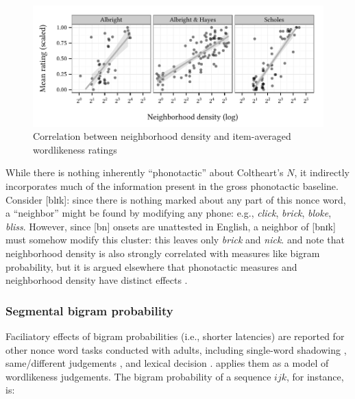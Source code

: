 
\begin{figure}[ht]
\centering
\includegraphics{neighborhood.pdf}
\caption{Correlation between neighborhood density and item-averaged wordlikeness ratings}
\label{neighborhood}
\end{figure}

While there is nothing inherently ``phonotactic'' about Coltheart's $N$, it indirectly incorporates much of the information present in the gross phonotactic baseline. 
Consider [blɪk]: since there is nothing marked about any part of this nonce word, a ``neighbor'' might be found by modifying any phone: e.g., \emph{click}, \emph{brick}, \emph{bloke}, \emph{bliss}. 
However, since [bn] onsets are unattested in English, a neighbor of [bnɪk] must somehow modify this cluster: this leaves only \emph{brick} and \emph{nick}. 
\citet{Bailey2001} and \citet{Frauenfelder1993} note that neighborhood density is also strongly correlated with measures like bigram probability, but it is argued elsewhere that phonotactic measures and neighborhood density have distinct effects \citep[e.g.,][]{Berent2003,Pitt1998b,Vitevitch1998,Vitevitch1999a}. 

\subsubsection{Segmental bigram probability}

Faciliatory effects of bigram probabilities (i.e., shorter latencies) are reported for other nonce word tasks conducted with adults, including single-word shadowing \citep{Vitevitch1997,Vitevitch1998}, same/different judgements \citep{Lipinski2005,Luce2001,Vitevitch1999a,Vitevitch2005}, and lexical decision \citep{Pylkkanen2002a}. \citet{Albright2009a} applies them as a model of wordlikeness judgements. The bigram probability of a sequence $ijk$, for instance, is:

